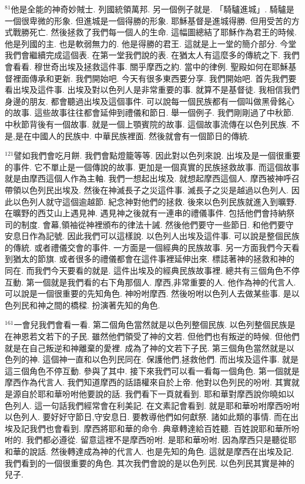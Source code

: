 \documentclass{book}
\begin{document}
$^{81}$他是全能的神奇妙賊士.
列國統領萬邦.
另一個例子就是.
「騎驢進城」.
騎驢是一個很卑微的形象.
但進城是一個得勝的形象.
耶穌基督是進城得勝.
但用受苦的方式戰勝死亡.
然後拯救了我們每一個人的生命.
這幅圖總結了耶穌作為君王的時候.
他是列國的主.
也是軟弱無力的.
他是得勝的君王.
這就是上一堂的簡介部分.
今堂我們會繼續完成這個表.
在第一堂我們說的表.
在猶太人有這麼多的傳統之下.
我們會看看.
穆世奇出埃及拯救這件事.
關乎摩西之約.
當中的律例.
聖殿如何在耶穌基督裡面傳承和更新.
我們開始吧.
今天有很多東西要分享.
我們開始吧.
首先我們要看出埃及這件事.
出埃及對以色列人是非常重要的事.
就算不是基督徒.
我相信我們身邊的朋友.
都會聽過出埃及這個事件.
可以說每一個民族都有一個叫做黑骨銘心的故事.
這些故事往往都會延伸到禮儀和節日.
舉一個例子.
我們剛剛過了中秋節.
中秋節背後有一個故事.
就是一個上顎賓院的故事.
這個故事流傳在以色列民族.
不是,是在中國人的民族中.
中華民族裡面.
然後就會有一個節日的傳統.

$^{121}$譬如我們會吃月餅.
我們會點燈籠等等.
因此對以色列來說.
出埃及是一個很重要的事件.
它不單止是一個傳說的故事.
更加是一個真實的民族拯救故事.
而這個故事就是由摩西這個人作為主軸.
我們一想起出埃及.
就想起摩西這個人.
摩西被神呼召帶領以色列民出埃及.
然後在神滅長子之災這件事.
滅長子之災是越過以色列人.
因此以色列人就守這個逾越節.
紀念神對他們的拯救.
後來以色列民族就進入到曠野.
在曠野的西艾山上遇見神.
遇見神之後就有一連串的禮儀事件.
包括他們會持納祭司的制度.
會幕,領袖從神裡頒布的律法十誡.
然後他們要守一些節日.
和他們要守安息日作為記號.
因此我們可以這樣說.
以色列人出埃及這件事.
可以說是整個民族的傳統.
或者禮儀交會的事件.
一方面是一個經典的民族故事.
另一方面我們今天看到猶太的節旗.
或者很多的禮儀都會在這件事裡延伸出來.
標誌著神的拯救和神的同在.
而我們今天要看的就是.
這件出埃及的經典民族故事裡.
總共有三個角色不停互動.
第一個就是我們看的右下角那個人.
摩西,非常重要的人.
他作為神的代言人.
可以說是一個很重要的先知角色.
神吩咐摩西.
然後吩咐以色列人去做某些事.
是以色列民和神之間的橋樑.
扮演著先知的角色.

$^{161}$一會兒我們會看一看.
第二個角色當然就是以色列整個民族.
以色列整個民族是在神恩若文若下的子民.
雖然他們領受了神的文若.
但他們也有叛逆的時候.
但他們就是在自己叛逆和神離棄的愛裡.
成為了神的文若下子民.
第三個角色當然就是以色列的神.
這個神一直和以色列民同在.
保護他們,拯救他們.
而出埃及這件事.
就是這三個角色不停互動.
參與了其中.
接下來我們可以看一看每一個角色.
第一個就是摩西作為代言人.
我們知道摩西的話語權來自於上帝.
他對以色列民的吩咐.
其實就是源自於耶和華吩咐他要說的話.
我們看下一頁就看到.
耶和華對摩西說你曉如以色列人.
這一句話我們經常會在利美記.
在文素記會看到.
就是耶和華吩咐摩西吩咐以色列人.
要好好守節日,守安息日.
要教導他們如何獻祭.
諸如此類的事情.
而在出埃及記我們也會看到.
摩西將耶和華的命令.
典章轉達給百姓聽.
百姓說耶和華所吩咐的.
我們都必遵從.
留意這裡不是摩西吩咐.
是耶和華吩咐.
因為摩西只是聽從耶和華的說話.
然後轉達成為神的代言人.
也是先知的角色.
這就是摩西在出埃及記.
我們看到的一個很重要的角色.
其次我們會說的是以色列民.
以色列民其實是神的兒子.
\end{document}
